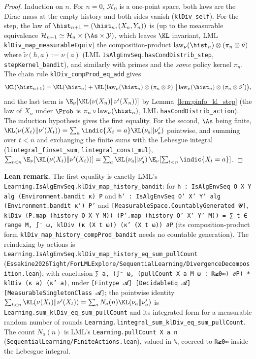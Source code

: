 \begin{proof}
\leanok
Induction on $n$. For $n = 0$, $\mathcal H_0$ is a one-point space, both laws are the Dirac
mass at the empty history and both sides vanish (\texttt{klDiv\_self}). For the step, the law
of $\hist_{n+1} = (\hist_n, (X_n, Y_n))$ is (up to the measurable equivalence
$\mathcal H_{n+1} \simeq \mathcal H_n \times (\As\times\mathcal Y)$, which leaves $\KL$ invariant,
LML \texttt{klDiv\_map\_measurableEquiv}) the composition-product
$\mathrm{law}_\nu(\hist_n) \otimes (\pi_n \otimes \tilde\nu)$ where $\tilde\nu(h, a) := \nu(a)$
(LML \texttt{IsAlgEnvSeq.hasCondDistrib\_step}, \texttt{stepKernel\_bandit}), and
similarly with primes and the \emph{same} policy kernel $\pi_n$. The chain rule
\texttt{klDiv\_compProd\_eq\_add} gives
\[
  \KL(\hist_{n+1}) = \KL(\hist_n)
  + \KL\big(\mathrm{law}_\nu(\hist_n)\otimes(\pi_n\otimes\tilde\nu)\,\big\|\,
      \mathrm{law}_\nu(\hist_n)\otimes(\pi_n\otimes\tilde\nu')\big),
\]
and the last term is $\E_\nu[\KL(\nu(X_n)\|\nu'(X_n))]$ by Lemma~\ref{lem:pinfo_kl_step} (the
law of $X_n$ under $\Prob$ is $\pi_n \circ \mathrm{law}_\nu(\hist_n)$, LML
\texttt{hasCondDistrib\_action}). The induction hypothesis gives the first equality. For the
second, $\As$ being finite,
$\KL(\nu(X_t)\|\nu'(X_t)) = \sum_a \indic\{X_t = a\}\KL(\nu_a\|\nu'_a)$ pointwise, and summing
over $t < n$ and exchanging the finite sums with the Lebesgue integral
(\texttt{lintegral\_finset\_sum}, \texttt{lintegral\_const\_mul}),
$\sum_{t<n}\E_\nu[\KL(\nu(X_t)\|\nu'(X_t))] = \sum_a \KL(\nu_a\|\nu'_a)\,\E_\nu[\sum_{t<n}\indic\{X_t = a\}]$.
\end{proof}

\textbf{Lean remark.} The first equality is exactly LML's
\texttt{Learning.IsAlgEnvSeq.klDiv\_map\_history\_bandit}: for \texttt{h : IsAlgEnvSeq O X Y alg
(Environment.bandit κ) P} and \texttt{h' : IsAlgEnvSeq O' X' Y' alg (Environment.bandit κ') P'} and
\texttt{[MeasurableSpace.CountablyGenerated 𝓨]}, \texttt{klDiv (P.map (history O X Y M))
(P'.map (history O' X' Y' M)) = ∑ t ∈ range M, ∫⁻ ω, klDiv (κ (X t ω)) (κ' (X t ω)) ∂P}
(its composition-product form \texttt{klDiv\_map\_history\_compProd\_bandit} needs no countable
generation). The reindexing by actions is
\texttt{Learning.IsAlgEnvSeq.klDiv\_map\_history\_eq\_sum\_pullCount}
(\texttt{Essakine2026Tight/ForLMLExplore/SequentialLearning/DivergenceDecomposition.lean}),
with conclusion \texttt{∑ a, (∫⁻ ω, (pullCount X a M ω : ℝ≥0∞) ∂P) * klDiv (κ a) (κ' a)}, under
\texttt{[Fintype 𝓐] [DecidableEq 𝓐] [MeasurableSingletonClass 𝓐]}; the pointwise identity
$\sum_{t<n}\KL(\nu(X_t)\|\nu'(X_t)) = \sum_a N_a(n)\KL(\nu_a\|\nu'_a)$ is
\texttt{Learning.sum\_klDiv\_eq\_sum\_pullCount} and its integrated form for a measurable random
number of rounds \texttt{Learning.lintegral\_sum\_klDiv\_eq\_sum\_pullCount}. The count $N_a(n)$ is
LML's \texttt{Learning.pullCount X a n} (\texttt{SequentialLearning/FiniteActions.lean}), valued in
\texttt{ℕ}, coerced to \texttt{ℝ≥0∞} inside the Lebesgue integral.

